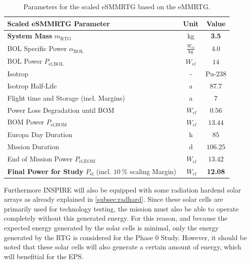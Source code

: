 \begin{table}[H]
\centering
\caption{Parameters for the scaled eSMMRTG based on the eMMRTG.}
\begin{tabular}{lcc}
\toprule
Scaled eSMMRTG Parameter &	Unit	&   Value            \\
\midrule
\textbf{System Mass} $m_\text{RTG}$ & kg  & \textbf{3.5}     \\
BOL Specific Power $\alpha_\text{BOL}$ & $\frac{W_{el}}{\text{kg}}$  & $4.0$     \\
BOL Power $P_{\text{el},\text{BOL}}$ & $ W_{el}$                    & $14$       \\
Isotrop                 &         -                           & Pu-238   \\
Isotrop Half-Life & a                                       & $87.7$     \\
Flight time and Storage (incl. Margins) & a                & $7$        \\
Power Loss Degradation until BOM & $\ W_{el}$                 & $0.56$     \\
BOM Power $P_{\text{el},\text{BOM}}$ & $\ W_{el}$                    & $13.44$    \\
Europa Day Duration & h                                     & $85$       \\
Mission Duration & d                                        & $106.25$   \\
End of Mission Power $P_{\text{el},\text{EOM}}$ & $\ W_{el}$         & $13.42$   \\
\textbf{Final Power for Study} $P_\text{el}$ (incl. $10~\%$ scaling Margin) & $\ W_{el}$  & \textbf{12.08}    \\
\bottomrule
\end{tabular}
\label{tab:esmmrtg}
\end{table}

Furthermore INSPIRE will also be equipped with some radiation hardend solar arrays as already explained in \autoref{subsec:radhard}\cite{FraunhoferInstituteforSolarEnergySystemsISE.2021}. Since these solar cells are primarily used for technology testing, the mission must also be able to operate completely without this generated energy. For this reason, and because the expected energy generated by the solar cells is minimal, only the energy generated by the RTG is considered for the Phase 0 Study. However, it should be noted that these solar cells will also generate a certain amount of energy, which will benefitial for the EPS.


